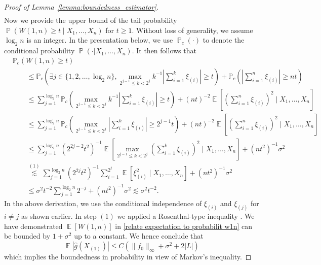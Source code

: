 \documentclass[12pt]{article}
\DeclareMathOperator*{\E}{\mathbb{E}}
\DeclareMathOperator*{\Prob}{\mathbb{P}}
\begin{document}
\begin{appendices}
\begin{proof}[Proof of Lemma~\ref{lemma:boundedness_estimator}]
\begin{equation}
\begin{aligned}
\end{aligned}
\end{equation}
Now we provide the upper bound of the tail probability $\Prob(W(1,n) \geq t \mid X_1,\ldots,X_n)$ for $t\geq 1$. Without loss of generality, we assume $\log_2 n$ is an integer. In the presentation below, we use $ \Prob_c(\cdot)$ to denote the conditional probability $\Prob(\cdot | X_1,\ldots,X_n)$. It then follows that
\begin{equation}\nonumber
    \begin{aligned}
   &\mathbb{P}_c(W(1,n) \geq t) \nonumber\\
   &\qquad\leq \mathbb{P}_c\left(\exists j \in \{1,2,\ldots,\log_2 n\}, \max_{2^{j-1} \leq k < 2^j} k^{-1}\left|\sum_{i=1}^{k} \xi_{(i)}\right | \geq t\right) +
     \mathbb{P}_c\left(\left|\sum_{i=1}^n \xi_{(i)}\right | \geq nt\right)\\
    & \qquad\leq \sum_{j = 1}^{\log_2 n}  \mathbb{P}_c\left(\max_{2^{j-1} \leq k < 2^j} k^{-1}\left|\sum_{i=1}^{k} \xi_{(i)}\right | \geq t\right) + (nt)^{-2}\E\left[\left(\sum_{i=1}^n \xi_{(i)}\right)^2\mid  X_1,\ldots,X_n\right]\\
    &\qquad \leq \sum_{j = 1}^{\log_2 n}  \mathbb{P}_c\left(\max_{2^{j-1} \leq k < 2^j} \left|\sum_{i=1}^{k} \xi_{(i)}\right | \geq 2^{j-1}t\right) + (nt)^{-2}\E\left[\left(\sum_{i=1}^n \xi_{(i)}\right)^2 \mid X_1,\ldots,X_n\right]\\
    &\qquad \leq \sum_{j = 1}^{\log_2 n}(2^{2j-2}t^2)^{-1} \E\left[\max_{2^{j-1} \leq k < 2^j} \left(\sum_{i=1}^{k} \xi_{(i)}\right )^2 \mid X_1,\ldots,X_n\right] + (nt^2)^{-1}\sigma^2\\
    &\qquad \stackrel{(1)}{\lesssim} \sum_{j = 1}^{\log_2 n} (2^{2j}t^2)^{-1} \sum_{i=1}^{2^j} \E[\xi_{(i)}^2 \mid X_1,\ldots,X_n] + (nt^2)^{-1}\sigma^2 \\ 
    &\qquad \leq \sigma^2 t^{-2}\sum_{j = 1}^{\log_2 n} 2^{-j} +  (nt^2)^{-1}\sigma^2 \lesssim \sigma^2t^{-2}.
    \end{aligned}
\end{equation}
In the above derivation, we use the conditional independence of $\xi_{(i)}$ and $\xi_{(j)}$ for $i \neq j$ as shown earlier. In step $(1)$ we applied a Rosenthal-type inequality \citep{merlevede2013rosenthal}. We have demonstrated $\E[W(1,n)]$ in \eqref{relate expectation to probabilit w1n} can be bounded by $1+\sigma^2$ up to a constant. We hence conclude that 
\begin{equation*}
    \E|\widehat g(X_{(1)})| \leq C (\|f_0\|_\infty + \sigma^2 + 2|L|)
\end{equation*}
which implies the boundedness in probability in view of Markov's inequality.


\end{proof}
\end{appendices}
\end{document}
